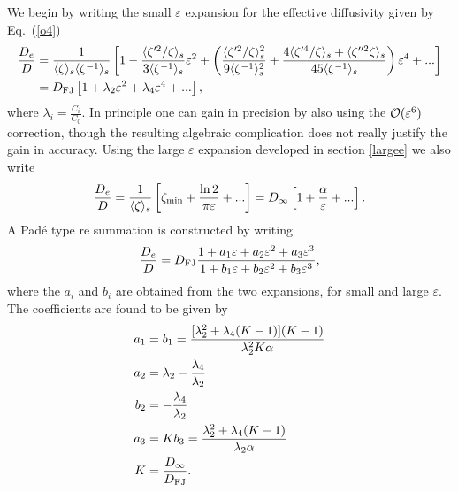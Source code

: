 \documentclass[pre,showpacs,preprintnumbers,amsmath,amssymb,superscriptaddress]{revtex4-1}
\begin{document}
{{We begin by writing the small $\varepsilon$ expansion for the effective diffusivity given by Eq.~(\ref{o4}) 
\begin{equation}
\begin{split}
\frac{D_e}{D} &= \frac{1}{\langle \zeta \rangle_s \langle \zeta^{-1} \rangle_s} \left[1-\frac{\langle \zeta'^2/\zeta \rangle_s}{3\langle \zeta^{-1} \rangle_s} \varepsilon^2 + \left(\frac{\langle \zeta'^2/\zeta \rangle_s^2}{9\langle \zeta^{-1} \rangle_s^2} + \frac{4 \langle \zeta'^4/\zeta \rangle_s + \langle \zeta''^2 \zeta \rangle_s}{45 \langle \zeta^{-1} \rangle_s}\right) \varepsilon^4 + ...\right] \\
&=D_{\rm FJ} \left[1+\lambda_2 \varepsilon^2 + \lambda_4 \varepsilon^4 + ...\right],
\end{split}
\end{equation}
where $\lambda_i =\frac{C_i}{C_0}$. In principle one can gain in precision by also using the ${\cal O}(\varepsilon^6)$ correction, though the resulting algebraic complication does
not really justify the gain in accuracy.
Using the large $\varepsilon$ expansion developed in section \ref{largee} we also write
\begin{equation}
\frac{D_e}{D} = \frac{1}{\langle \zeta \rangle_s} \left[\zeta_{\rm min}+ \frac{\ln 2}{\pi \varepsilon}+ ...\right] = D_{\infty} \left[1+ \frac{\alpha}{\varepsilon}+ ...\right].
\end{equation}
A Pad\'e type re summation is constructed by writing
\begin{equation}
\frac{D_e}{D} = D_{\rm FJ} \frac{1+ a_1 \varepsilon + a_2 \varepsilon^2 +a_3 \varepsilon^3}{1+ b_1 \varepsilon + b_2 \varepsilon^2 +b_3 \varepsilon^3},
\end{equation}
where the $a_i$ and $b_i$ are obtained from the two expansions, for small and large $\varepsilon$. The coefficients are found to be given by
\begin{equation}
\begin{split}
a_1&=b_1=\frac{[\lambda_2^2+\lambda_4(K-1)](K-1)}{\lambda_2^2 K \alpha} \\
a_2&=\lambda_2 - \frac{\lambda_4}{\lambda_2} \\
b_2&=- \frac{\lambda_4}{\lambda_2} \\
a_3&=Kb_3 = \frac{\lambda_2^2+\lambda_4(K-1)}{\lambda_2 \alpha} \\
K&=\frac{D_{\infty}}{D_{\rm FJ}}.\label{pade}
\end{split}
\end{equation}

}}
\end{document}
